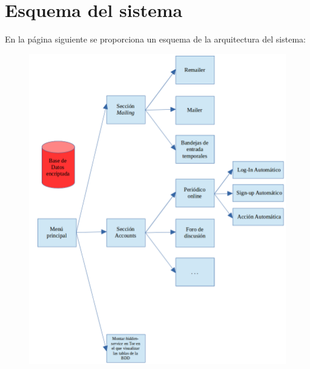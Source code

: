 \chapter{Esquema del sistema}
\label{Anexo:esquema}

En la página siguiente se proporciona un esquema de la arquitectura del sistema:
\begin{figure}
	\centerline{
		\mbox{\includegraphics[width=8.00in]{images/esquema.png}}
	}
	\label{fig:esquema}
\end{figure}


\newpage \thispagestyle{empty} %